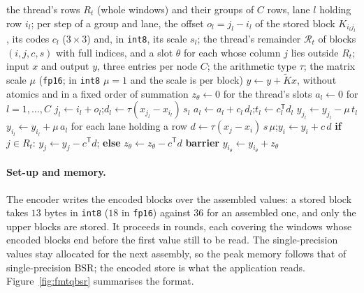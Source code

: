 \documentclass[sigconf,balance=false]{acmart}
\newcommand{\R}{\mathbb{R}}
\begin{document}
\begin{algorithm*}[t]
\caption{Application of the quantized assembled matrix (difference form, each pair stored once),
one thread}
\label{alg:qbsr}
\begin{algorithmic}[1]
\Require the thread's rows $R_t$ (whole windows) and their groups of $C$ rows, lane $l$ holding row
  $i_l$; per step of a group and lane, the offset $o_l=j_l-i_l$ of the stored block $K_{i_lj_l}$, its
  codes $c_l$ ($3\times3$) and, in \texttt{int8}, its scale $s_l$; the thread's remainder
  $\mathcal{R}_t$ of blocks $(i,j,c,s)$ with full indices, and a slot $\theta$ for each whose column
  $j$ lies outside $R_t$; input $x$ and output $y$, three entries per node
\Constants $C$; the arithmetic type $\tau$; the matrix scale $\mu$ (\texttt{fp16}; in \texttt{int8}
  $\mu=1$ and the scale is per block)
\Ensure $y \gets y + \widetilde{K}x$, without atomics and in a fixed order of summation
\State $z_\theta \gets 0$ for the thread's slots \Comment{$z_\theta\in\R^3$}
  \State $a_l \gets 0$ for $l=1,\dots,C$ 
    \State $j_l \gets i_l + o_l$;\quad $d_l \gets \tau(x_{j_l} - x_{i_l})\, s_l$
    \State $a_l \gets a_l + c_l\, d_l$;\quad $t_l \gets c_l^{\mathsf T} d_l$
     
      \State $y_{j_l} \gets y_{j_l} - \mu\, t_l$ 
    \EndFor
  \EndFor
  \State $y_{i_l} \gets y_{i_l} + \mu\, a_l$ for each lane holding a row 
\EndFor
{}
  \State $d \gets \tau(x_j - x_i)\, s\,\mu$;\quad $y_i \gets y_i + c\, d$
  \State \textbf{if} $j\in R_t$: $y_j \gets y_j - c^{\mathsf T}d$; \textbf{else} $z_\theta \gets z_\theta - c^{\mathsf T}d$
\EndFor
\State \textbf{barrier} 
  \State $y_{i_\theta} \gets y_{i_\theta} + z_\theta$
\EndFor
\end{algorithmic}
\end{algorithm*}

\paragraph{Set-up and memory.}  The encoder writes the encoded blocks over the assembled values: a
stored block takes $13$ bytes in \texttt{int8} ($18$ in \texttt{fp16}) against $36$ for an assembled
one, and only the upper blocks are stored.  It proceeds in rounds, each covering the windows whose
encoded blocks end before the first value still to be read.  The single-precision values stay
allocated for the next assembly, so the peak memory follows that of single-precision BSR; the
encoded store is what the application reads.  Figure~\ref{fig:fmtqbsr} summarises the format.
\end{document}
